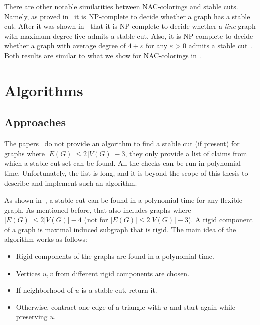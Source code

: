 There are other notable similarities between NAC-colorings and stable cuts.
Namely, as proved in~\cite{stable_cuts_complexity_base} it is NP-complete
to decide whether a graph has a stable cut.
After it was shown in~\cite{stable_cuts_complexity_deg_five} that
it is NP-complete to decide whether a \emph{line} graph with maximum degree five
admits a stable cut.
%
Also, it is NP-complete to decide whether a graph with average degree of
$4+\varepsilon$ for any $\varepsilon > 0$ admits a stable cut~\cite{stable_cuts_complexity_deg_five}.
Both results are similar to what we show for NAC-colorings in .
%

\section{Algorithms}

\subsection{Approaches}

The papers~\cite{stable_cuts_2v_3,stable_cuts_2v_3_revisit} do not provide
an algorithm to find a stable cut (if present)
for graphs where \(|E(G)| \le 2|V(G)|-3 \),
they only provide a list of claims
from which a stable cut set can be found.
All the checks can be run in polynomial time.
Unfortunately, the list is long,
and it is beyond the scope of this thesis
to describe and implement such an algorithm.

As shown in~\cite[Algorithm 1]{stable_cuts_legersky}, a stable cut can be found
in a polynomial time for any flexible graph.
As mentioned before, that also includes graphs
where \( |E(G)| \le 2|V(G)| - 4 \) (not for \( |E(G)| \le 2|V(G)| - 3 \)).
A rigid component of a graph is maximal induced subgraph that is rigid.
The main idea of the algorithm works as follows:
%
\begin{itemize}
	\item Rigid components of the graphs are found in a polynomial time.
	\item Vertices \( u, v \) from different rigid components are chosen.
	\item If neighborhood of \( u \) is a stable cut, return it.
	\item Otherwise, contract one edge of a triangle with \( u \) and start again while preserving \( u \).
\end{itemize}

